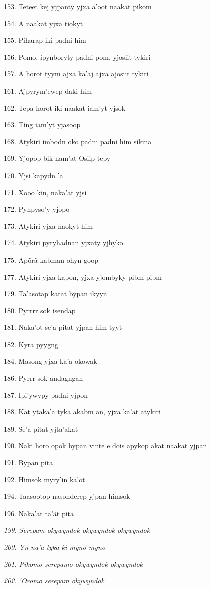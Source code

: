 153. Teteet kej yjpanty yjxa a'oot naakat pikom

154. A naakat yjxa tiokyt

155. Piharap iki padni him

156. Pomo, ipynboryty padni pom, yjosiit tykiri

157. A horot tyym ajxa ka'aj ajxa ajosiit tykiri

161. Ajpyrym'ewep daki him

162. Tepa horot iki naakat iam'yt yjsok

163. Ting iam'yt yjasoop

168. Atykiri imbodn oko padni padni him sikina

169. Yjopop bik nam'at Osiip tepy

170. Yjsi kapydn 'a

171. Xooo kin, naka'at yjsi

172. Pynpyso'y yjopo

173. Atykiri yjxa naokyt him

174. Atykiri pyryhadnan yjxaty yjhyko

175. Apõrã kabman ohyn goop

177. Atykiri yjxa kapon, yjxa yjombyky pibm pibm

179. Ta'asotap katat bypan ikyyn

180. Pyrrrr sok isendap

181. Naka'ot se'a pitat yjpan him tyyt

182. Kyra pyygng

184. Masong yjxa ka'a okowak

186. Pyrrr sok andagngan

187. Ipi'ywypy padni yjpon

188. Kat ytaka'a tyka akabm an, yjxa ka'at atykiri

189. Se'a pitat yjta'akat

190. Naki horo opok bypan vinte e dois apykop akat naakat yjpan

191. Bypan pita

192. Himsok myry'in ka'ot

194. Taasootop nasonderep yjpan himsok

196. Naka'at ta'ãt pita

\emph{199. Serepam okywyndok okywyndok okywyndok}

\emph{200. Yn na'a tyka ki myno myno}

\emph{201. Pikomo serepamo okywyndok okywyndok}

\emph{202. `Oromo serepam okywyndok}

